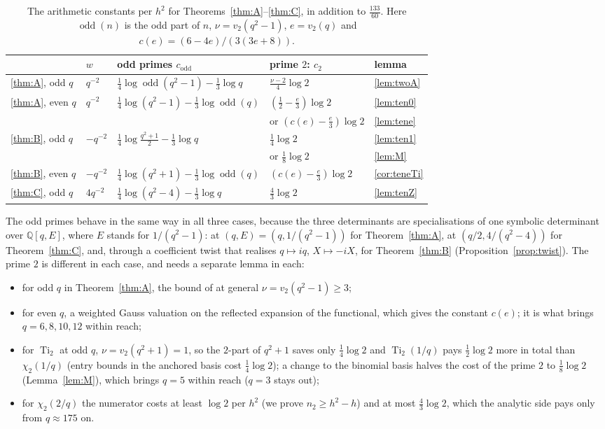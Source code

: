 \documentclass[11pt]{amsart}
\theoremstyle{definition}
\theoremstyle{remark}
\numberwithin{equation}{section}
\newcommand{\QQ}{\mathbb{Q}}
\newcommand{\Ti}{\operatorname{Ti}}
\newcommand{\odd}{\operatorname{odd}}
\begin{document}
\begin{table}[ht]
\centering\small
\begin{tabular}{@{}lllll@{}}
\toprule
 & $w$ & odd primes $c_{\mathrm{odd}}$ & prime $2$: $c_2$ & lemma\\
\midrule
\ref{thm:A}, odd $q$ & $q^{-2}$ & $\frac14\log\odd(q^2-1)-\frac13\log q$ & $\frac{\nu-2}4\log2$ & \ref{lem:twoA}\\
\ref{thm:A}, even $q$ & $q^{-2}$ & $\frac14\log(q^2-1)-\frac13\log\odd(q)$ & $(\frac12-\frac e3)\log2$ & \ref{lem:ten0}\\
 & & & or $(c(e)-\frac e3)\log2$ & \ref{lem:tene}\\
\ref{thm:B}, odd $q$ & $-q^{-2}$ & $\frac14\log\frac{q^2+1}2-\frac13\log q$ & $\frac14\log2$ & \ref{lem:ten1}\\
 & & & or $\frac18\log2$ & \ref{lem:M}\\
\ref{thm:B}, even $q$ & $-q^{-2}$ & $\frac14\log(q^2+1)-\frac13\log\odd(q)$ & $(c(e)-\frac e3)\log2$ & \ref{cor:teneTi}\\
\ref{thm:C}, odd $q$ & $4q^{-2}$ & $\frac14\log(q^2-4)-\frac13\log q$ & $\frac43\log2$ & \ref{lem:tenZ}\\
\bottomrule
\end{tabular}
\caption{The arithmetic constants per $h^2$ for Theorems~\ref{thm:A}--\ref{thm:C}, in addition to $\frac{133}{60}$.
Here $\odd(n)$ is the odd part of $n$, $\nu=v_2(q^2-1)$, $e=v_2(q)$ and $c(e)=(6-4e)/(3(3e+8))$.}\label{tab:constants}
\end{table}

The odd primes behave in the same way in all three cases, because the three determinants are specialisations of one
symbolic determinant over $\QQ[q,E]$, where $E$ stands for $1/(q^2-1)$: at $(q,E)=(q,1/(q^2-1))$ for
Theorem~\ref{thm:A}, at $(q/2,4/(q^2-4))$ for Theorem~\ref{thm:C}, and, through a coefficient twist that realises
$q\mapsto iq$, $X\mapsto-iX$, for Theorem~\ref{thm:B} (Proposition~\ref{prop:twist}). The prime $2$ is different in each
case, and needs a separate lemma in each:
\begin{itemize}
\item for odd $q$ in Theorem~\ref{thm:A}, the bound of \cite{Chi2Paper} at general $\nu=v_2(q^2-1)\ge3$;
\item for even $q$, a weighted Gauss valuation on the reflected expansion of the functional, which gives the constant
  $c(e)$; it is what brings $q=6,8,10,12$ within reach;
\item for $\Ti_2$ at odd $q$, $\nu=v_2(q^2+1)=1$, so the $2$-part of $q^2+1$ saves only $\frac14\log2$ and
  $\Ti_2(1/q)$ pays $\frac12\log2$ more in total than $\chi_2(1/q)$ (entry bounds in the anchored basis cost
  $\frac14\log2$); a change to the binomial basis halves the cost of the prime $2$ to $\frac18\log2$
  (Lemma~\ref{lem:M}), which brings $q=5$ within reach ($q=3$ stays out);
\item for $\chi_2(2/q)$ the numerator costs at least $\log2$ per $h^2$ (we prove $n_2\ge h^2-h$) and at most
  $\frac43\log2$, which the analytic side pays only from $q\approx175$ on.
\end{itemize}
\end{document}

